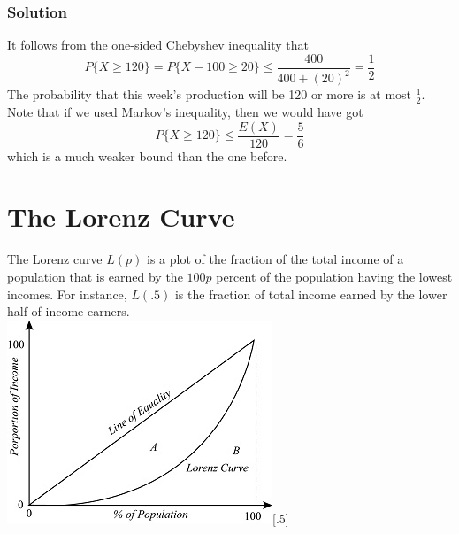 \subsubsection*{Solution}
It follows from the one-sided Chebyshev inequality that \[P\{X\geq 120\} = P\{X - 100\geq 20\}\leq \frac{400}{400 + (20)^2} = \frac{1}{2}\] The probability that this week's production will be 120 or more is at most $\frac{1}{2}$. Note that if we used Markov's inequality, then we would have got \[P\{X\geq 120\}\leq \frac{E(X)}{120} = \frac{5}{6}\] which is a much weaker bound than the one before. 
\section{The Lorenz Curve}
The Lorenz curve $L(p)$ is a plot of the fraction of the total income of a population that is earned by the $100p$ percent of the population having the lowest incomes. For instance, $L(.5)$ is the fraction of total income earned by the lower half of income earners.\\
\includegraphics{LorenzCurve.jpg}[.5]